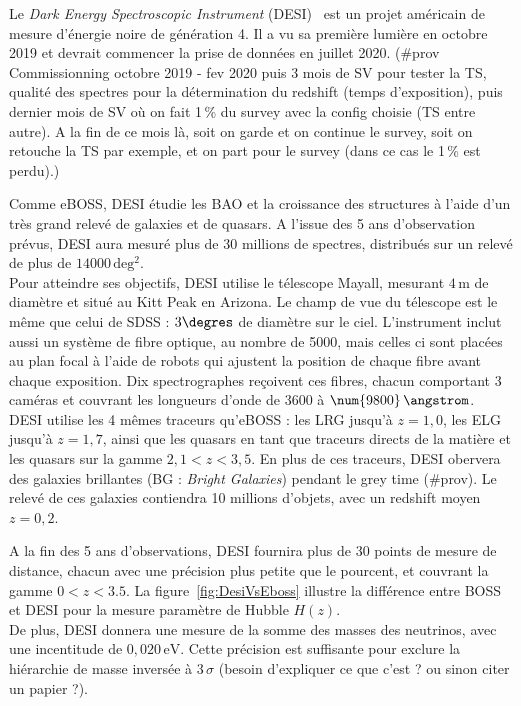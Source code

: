 \documentclass[11pt, twoside, a4paper, openright]{report}
\begin{document}
Le \emph{Dark Energy Spectroscopic Instrument} (DESI)~\cite{DESICollaboration2016} est un projet américain de mesure d'énergie noire de génération 4. Il a vu sa première lumière en octobre 2019 et devrait commencer la prise de données en juillet 2020. (\#prov Commissionning octobre 2019 - fev 2020 puis 3 mois de SV pour tester la TS, qualité des spectres pour la détermination du redshift (temps d'exposition), puis dernier mois de SV o\`u on fait 1\,\% du survey avec la config choisie (TS entre autre). A la fin de ce mois là, soit on garde et on continue le survey, soit on retouche la TS par exemple, et on part pour le survey (dans ce cas le 1\,\% est perdu).)

Comme eBOSS, DESI étudie les BAO et la croissance des structures à l'aide d'un très grand relevé de galaxies et de quasars. A l'issue des 5 ans d'observation prévus, DESI aura mesuré plus de 30 millions de spectres, distribués sur un relevé de plus de $\num{14000}\,\mathrm{deg^{2}}$. \\
Pour atteindre ses objectifs, DESI utilise le télescope Mayall, mesurant $4\,\mathrm{m}$ de diamètre et situé au Kitt Peak en Arizona. Le champ de vue du télescope est le même que celui de SDSS : $3\degres$ de diamètre sur le ciel. L'instrument inclut aussi un système de fibre optique, au nombre de \num{5000}, mais celles ci sont placées au plan focal à l'aide de robots qui ajustent la position de chaque fibre avant chaque exposition. Dix spectrographes reçoivent ces fibres, chacun comportant 3 caméras et couvrant les longueurs d'onde de \num{3600} à $\num{9800}\,\angstrom$. \\
‌‌DESI utilise les 4 mêmes traceurs qu'eBOSS : les LRG jusqu'à $z=1,0$, les ELG jusqu'à $z=1,7$, ainsi que les quasars en tant que traceurs directs de la matière et les quasars \lya{} sur la gamme $2,1 < z < 3,5$. En plus de ces traceurs, DESI obervera des galaxies brillantes (BG : \emph{Bright Galaxies}) pendant le grey time (\#prov). Le relevé de ces galaxies contiendra 10 millions d'objets, avec un redshift moyen $z=0,2$.

A la fin des 5 ans d'observations, DESI fournira plus de 30 points de mesure de distance, chacun avec une précision plus petite que le pourcent, et couvrant la gamme $0 < z < 3.5$. La figure~\ref{fig:DesiVsEboss} illustre la différence entre BOSS et DESI pour la mesure paramètre de Hubble $H(z)$.\\
De plus, DESI donnera une mesure de la somme des masses des neutrinos, avec une incentitude de $0,020\,\mathrm{eV}$. Cette précision est suffisante pour exclure la hiérarchie de masse inversée à $3\,\sigma$ (besoin d'expliquer ce que c'est ? ou sinon citer un papier ?).
\end{document}
